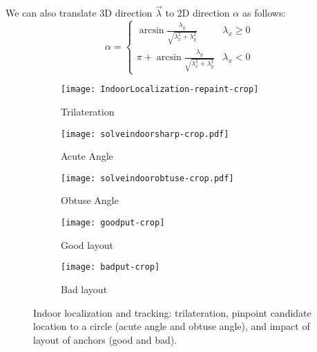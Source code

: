 \documentclass[]{sig-alternate-10pt}
\begin{document}
We can also translate 3D direction $\overrightarrow\lambda$ to 2D direction $\alpha$ as follows:
\begin{equation}
\alpha=\begin{cases}
    \arcsin\frac{\lambda_{y}}{\sqrt {\lambda_{x}^2+\lambda_y^2}} & \lambda_x \geq 0\\ \pi+\arcsin\frac{\lambda_{y}}{\sqrt {\lambda_{x}^2+\lambda_y^2}} & \lambda_x<0 \end{cases}
\label{eq:arctan} \end{equation}

 \begin{figure*}
     \begin{centering}
         \begin{subfigure}{0.30\textwidth}
             {\texttt{[image: IndoorLocalization-repaint-crop]}}
             \caption{Trilateration}
             \label{fig:Fine-grained-Indoor-Location}
         \end{subfigure}
         \begin{subfigure}{0.16\textwidth}
             {\texttt{[image: solveindoorsharp-crop.pdf]}}
             \caption{Acute Angle}
             \label{fig:solveindoor-a}
\end{subfigure}
         \begin{subfigure}{0.16\textwidth}
             {\texttt{[image: solveindoorobtuse-crop.pdf]}}
             \caption{Obtuse Angle}
             \label{fig:solveindoor-b}
         \end{subfigure}
         \begin{subfigure}{0.16\textwidth}
             {\texttt{[image: goodput-crop]}}
             \caption{Good layout}
             \label{fig:layout-g}
         \end{subfigure}
         \begin{subfigure}{0.18\textwidth}
             {\texttt{[image: badput-crop]}}
             \caption{Bad layout}
             \label{fig:layout-b}
         \end{subfigure}
         \caption{Indoor localization and tracking: trilateration, pinpoint
             candidate location to a circle (acute angle and obtuse angle), and
         impact of layout  of anchors (good and bad).}
         \label{fig:location-cases}
     \end{centering}
 \end{figure*}
\end{document}
